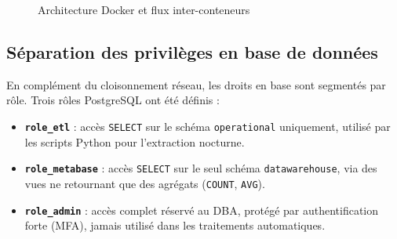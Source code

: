 \documentclass[12pt, a4paper]{report}
\begin{document}
\begin{itemize}[label=\textcolor{chuBlue}{\textbullet}]
\begin{figure}[H]
{%
  }
  \caption{Architecture Docker et flux inter-conteneurs}
  \label{fig:docker_networks}
\end{figure}

\subsection{Séparation des privilèges en base de données}

En complément du cloisonnement réseau, les droits en base sont segmentés par rôle. Trois rôles PostgreSQL ont été définis :

\begin{itemize}[label=\textcolor{chuBlue}{\textbullet}]
  \item \textbf{\texttt{role\_etl}} : accès \texttt{SELECT} sur le schéma \texttt{operational} uniquement, utilisé par les scripts Python pour l'extraction nocturne.
  \item \textbf{\texttt{role\_metabase}} : accès \texttt{SELECT} sur le seul schéma \texttt{datawarehouse}, via des vues ne retournant que des agrégats (\texttt{COUNT}, \texttt{AVG}).
  \item \textbf{\texttt{role\_admin}} : accès complet réservé au DBA, protégé par authentification forte (MFA), jamais utilisé dans les traitements automatiques.
\end{itemize}


\end{itemize}
\end{document}
